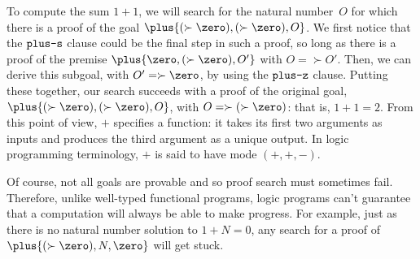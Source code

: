 To compute the sum $1 + 1$, we
will search for the natural number~$O$ for which there is a proof of the goal $\plus{(\succ{\zero}),(\succ{\zero}),O}$.
We first notice that the $\text{\normalfont\ttfamily plus-s}$ clause could be the final step in such a proof, so long as there is a proof of the premise $\plus{\zero,(\succ{\zero}),O'}$ with $O = \succ{O'}$.
Then, we can derive this subgoal, with $O' = \succ{\zero}$, by using the $\text{\normalfont\ttfamily plus-z}$ clause.
Putting these together, our search succeeds with a proof of the original goal, $\plus{(\succ{\zero}),(\succ{\zero}),O}$, with $O = \succ{(\succ{\zero})}$: that is, $1 + 1 = 2$.
From this point of view, $\plus{}$ specifies a function: it takes its first two arguments as inputs and produces the third argument as a unique output.
In logic programming terminology, $\plus{}$ is said to have mode $(+,+,-)$.%

Of course, not all goals are provable and so proof search must sometimes fail.
Therefore, unlike well-typed functional programs, logic programs can't guarantee that a computation will always be able to make progress.
For example, just as there is no natural number solution to $1 + N = 0$, any search for a proof of $\plus{(\succ{\zero}),N,\zero}$ will get stuck.







